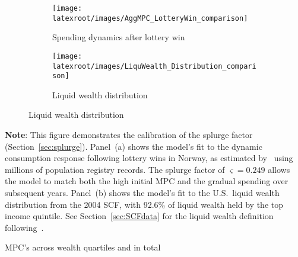 \documentclass[qe]{econsocart}
\begin{document}
\begin{figure}[H]
  \centering
  \caption{Model fit to spending behavior and wealth distribution}
  \label{fig:splurge_estimation} 
    \centering
    \begin{subfigure}[b]{0.48\textwidth}
      \centering
      \texttt{[image: \\latexroot/images/AggMPC\_LotteryWin\_comparison]}
      \caption{Spending dynamics after lottery win}
      \label{fig:aggmpclotterywin} 
    \end{subfigure}
    \hfill
    \begin{subfigure}[b]{0.48\textwidth}
      \centering
      \texttt{[image: \\latexroot/images/LiquWealth\_Distribution\_comparison]}
      \caption{Liquid wealth distribution}
      \label{fig:liquwealthdistribution} 
    \end{subfigure}
\end{figure}
\noindent\parbox{\textwidth}{\footnotesize
  \textbf{Note}: This figure demonstrates the calibration of the splurge factor (Section~\ref{sec:splurge}).
  Panel~(a) shows the model's fit to the dynamic consumption response following lottery wins in Norway,
  as estimated by~\cite{fagereng-mpc-2021} using millions of population registry records.
  The splurge factor of $\varsigma = 0.249$ allows the model to match both the high initial MPC
  and the gradual spending over subsequent years.
  Panel~(b) shows the model's fit to the U.S.\ liquid wealth distribution from the 2004 SCF,
  with 92.6\% of liquid wealth held by the top income quintile.
  See Section~\ref{sec:SCFdata} for the liquid wealth definition following~\cite{kaplan2014model}.
}

\vspace{0.5em}  

\begin{table}[tb] 
  \caption{MPC's across wealth quartiles and in total}
  \label{tab:MPC-WQ} 
  \centering

  \setlength{\fboxrule}{0pt}
  \vspace{0.5em}

  
\end{table}
\end{document}
